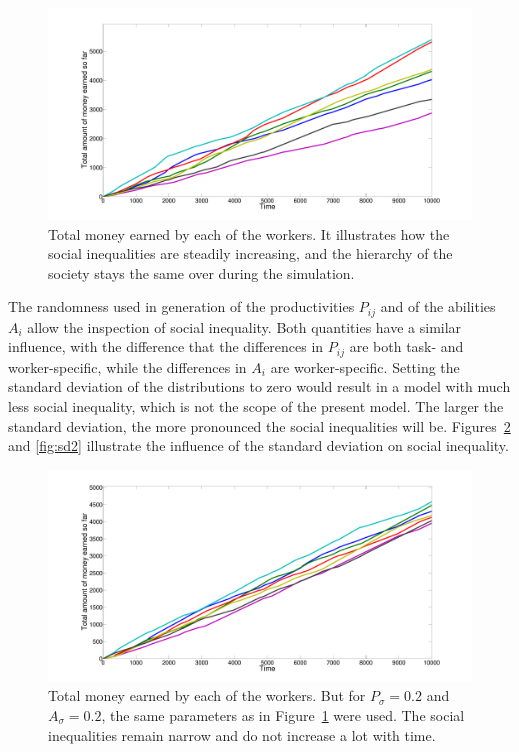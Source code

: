 \begin{figure}[h!]
	\centering
	\includegraphics[width=\textwidth]{../figures/totalmoney.pdf}
	\caption{Total money earned by each of the workers. It illustrates how the social inequalities are steadily increasing, and the hierarchy of the society stays the same over during the simulation.}
	\label{fig:sim1totalmoney}
\end{figure}

The randomness used in generation of the productivities $P_{ij}$ and of the abilities $A_i$ allow the inspection of social inequality. Both quantities have a similar influence, with the difference that the differences in $P_{ij}$ are both task- and worker-specific, while the differences in $A_i$ are worker-specific. Setting the standard deviation of the distributions to zero would result in a model with much less social inequality, which is not the scope of the present model. The larger the standard deviation, the more pronounced the social inequalities will be. Figures~\ref{fig:sd1} and \ref{fig:sd2} illustrate the influence of the standard deviation on social inequality.

\begin{figure}[h!]
	\centering
	\includegraphics[width=\textwidth]{../figures/sd1.pdf}
	\caption{Total money earned by each of the workers. But for $P_\sigma=0.2$ and $A_\sigma=0.2$, the same parameters as in Figure~\ref{fig:sim1totalmoney} were used. The social inequalities remain narrow and do not increase a lot with time.}
	\label{fig:sd1}
\end{figure}

